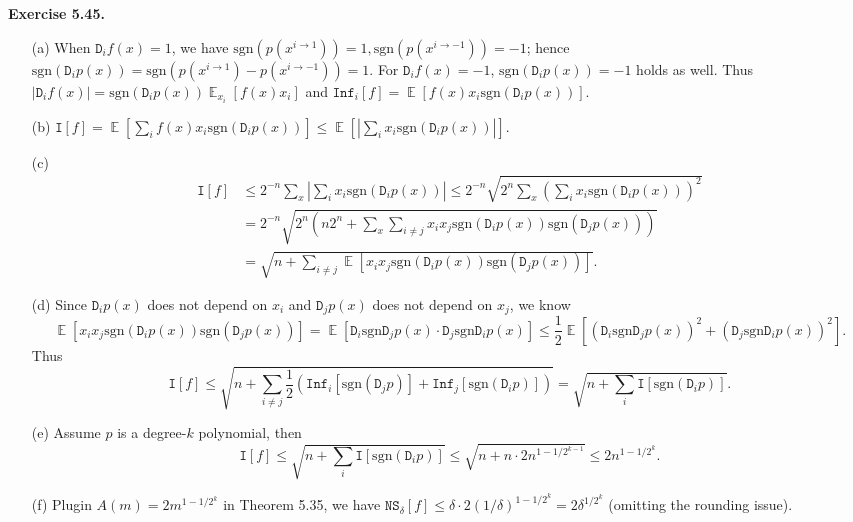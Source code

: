 \documentclass[a4paper]{article}
\newenvironment{exercise}[1]{
	\par
	\noindent\textbf{Exercise #1.}\quad
}{
	\par
	\bigskip
}
\DeclareMathOperator*{\E}{\mathbb E}
\newcommand{\abs}[1]{{\left| #1 \right|}}
\newcommand{\pbra}[1]{{\left( #1 \right)}}
\newcommand{\sbra}[1]{{\left[ #1 \right]}}
\newcommand{\sgn}{\text{sgn}}
\newcommand{\Inf}{\mathtt{Inf}}
\newcommand{\Dtt}{\mathtt{D}}
\newcommand{\Itt}{\mathtt{I}}
\newcommand{\NS}{\mathtt{NS}}
\begin{document}
\begin{exercise}{5.45}
    \begin{itemize}
        \item[(a)] 
            When $\Dtt_if(x)=1$, we have $\sgn(p(x^{i\to 1}))=1,\sgn(p(x^{i\to-1}))=-1$; 
            hence $\sgn(\Dtt_ip(x))=\sgn(p(x^{i\to 1})-p(x^{i\to-1}))=1$.
            For $\Dtt_if(x)=-1$, $\sgn(\Dtt_ip(x))=-1$ holds as well.
            Thus $\abs{\Dtt_if(x)}=\sgn(\Dtt_ip(x))\E_{x_i}\sbra{f(x)x_i}$ and
            $\Inf_i[f]=\E\sbra{f(x)x_i\sgn(\Dtt_ip(x))}$.
        \item[(b)]
            $\Itt[f]=\E\sbra{\sum_if(x)x_i\sgn(\Dtt_ip(x))}\leq\E\sbra{\abs{\sum_ix_i\sgn(\Dtt_ip(x))}}$.
        \item[(c)]
            \begin{align*}
            \Itt[f]
                &\leq2^{-n}\sum_x\abs{\sum_ix_i\sgn(\Dtt_ip(x))}
                \leq2^{-n}\sqrt{2^n\sum_x\pbra{\sum_ix_i\sgn(\Dtt_ip(x))}^2}\\
                &=2^{-n}\sqrt{2^n\pbra{n2^n+\sum_x\sum_{i\neq j}x_ix_j\sgn(\Dtt_ip(x))\sgn(\Dtt_jp(x))}}\\
                &=\sqrt{n+\sum_{i\neq j}\E\sbra{x_ix_j\sgn(\Dtt_ip(x))\sgn(\Dtt_jp(x))}}.
            \end{align*}
        \item[(d)] Since $\Dtt_ip(x)$ does not depend on $x_i$ and $\Dtt_jp(x)$ does not depend on $x_j$, we know
            $$
            \E\sbra{x_ix_j\sgn(\Dtt_ip(x))\sgn(\Dtt_jp(x))}
            =\E\sbra{\Dtt_i\sgn\Dtt_jp(x)\cdot\Dtt_j\sgn\Dtt_ip(x)}
            \leq\frac12\E\sbra{\pbra{\Dtt_i\sgn\Dtt_jp(x)}^2+\pbra{\Dtt_j\sgn\Dtt_ip(x)}^2}.
            $$
            Thus
            $$
            \Itt[f]
            \leq\sqrt{n+\sum_{i\neq j}\frac12\pbra{\Inf_i[\sgn(\Dtt_jp)]+\Inf_j[\sgn(\Dtt_ip)]}}
            =\sqrt{n+\sum_i\Itt[\sgn(\Dtt_ip)]}.
            $$
        \item[(e)] Assume $p$ is a degree-$k$ polynomial, then
            $$
            \Itt[f]\leq\sqrt{n+\sum_i\Itt[\sgn(\Dtt_ip)]}\leq\sqrt{n+n\cdot 2n^{1-1/2^{k-1}}}
            \leq2n^{1-1/2^k}.
            $$
        \item[(f)] Plugin $A(m)=2m^{1-1/2^k}$ in Theorem 5.35, we have $\NS_\delta[f]\leq\delta\cdot 2(1/\delta)^{1-1/2^k}=2\delta^{1/2^k}$ (omitting the rounding issue).
    \end{itemize}
\end{exercise}
\end{document}
